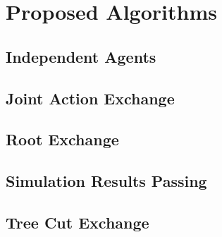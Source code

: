 \section{Proposed Algorithms}

\subsection{Independent Agents}
\subsection{Joint Action Exchange}
\subsection{Root Exchange}
\subsection{Simulation Results Passing}
\subsection{Tree Cut Exchange}
